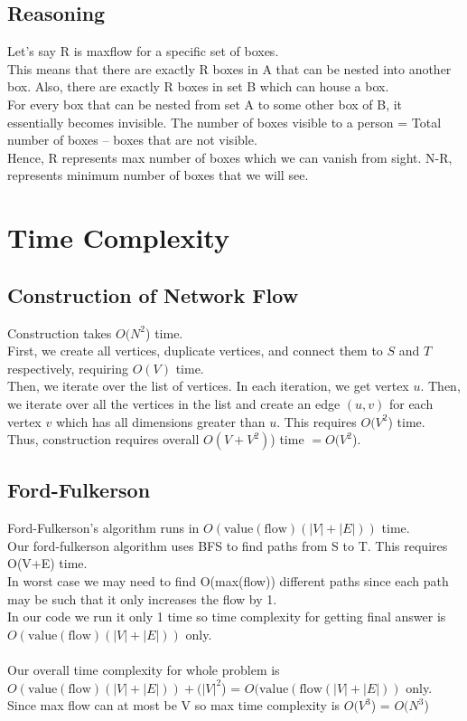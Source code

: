 \documentclass{article}
\begin{document}
\subsection{Reasoning}
Let’s say R is maxflow for a specific set of boxes.\\
This means that there are exactly R boxes in A that can be nested into another box. Also, there are exactly R boxes in set B which can house a box. \\
For every box that can be nested from set A to some other box of B, it essentially becomes invisible. The number of boxes visible to a person = Total number of boxes – boxes that are not visible. \\
Hence, R represents max number of boxes which we can vanish from sight. N-R, represents minimum number of boxes that we will see.
\\
\section{Time Complexity}
\subsection{Construction of Network Flow}
Construction takes \(O(N^{2}\)) time.\\
First, we create all vertices, duplicate vertices, and connect them to \(S\) and \(T\) respectively, requiring \(O(V)\) time.\\
Then, we iterate over the list of vertices. In each iteration, we get vertex \(u\). Then, we iterate over all the vertices in the list and create an edge \((u,v)\) for each vertex \(v\) which has all dimensions greater than \(u\). This requires \(O(V^{2}\)) time.\\
Thus, construction requires overall \(O(V+V^{2})\)) time \(= O(V^{2}\)).
\subsection{Ford-Fulkerson}
Ford-Fulkerson's algorithm runs in \(O(\text{value}(\text{flow})(|V| + |E|))\) time.\\
Our ford-fulkerson algorithm uses BFS to find paths from S to T. This requires O(V+E) time. \\
In worst case we may need to find O(max(flow)) different paths since each path may be such that it only increases the flow by 1.\\
In our code we run it only 1 time so time complexity for getting final answer is \(O(\text{value}(\text{flow})(|V| + |E|))\) only.\\\\
Our overall time complexity for whole problem is \(O(\text{value}(\text{flow})(|V| + |E|))+(|V|^{2}\)) = \(O(\text{value}(\text{flow}(|V| + |E|))\) only.
\\
Since max flow can at most be V so max time complexity is \(O(V^{3}\)) = \(O(N^{3}\))
\end{document}
